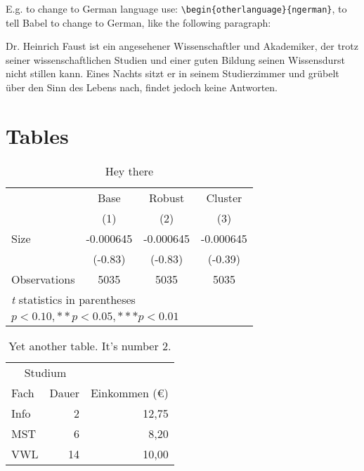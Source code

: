 E.g. to change to German language use: \verb|\begin{otherlanguage}{ngerman}|, to tell Babel to change to German, like the following paragraph:

\begin{otherlanguage}{ngerman}
Dr. Heinrich Faust ist ein angesehener Wissenschaftler und Akademiker, der trotz seiner wissenschaftlichen Studien und einer guten Bildung seinen Wissensdurst nicht stillen kann. Eines Nachts sitzt er in seinem Studierzimmer und grübelt über den Sinn des Lebens nach, findet jedoch keine Antworten.
\end{otherlanguage}

\section{Tables}

\begin{table}[H]\centering
	\libertineLF
	\begin{tabular}{l*{3}{c}}
		\toprule
		&     Base   &   Robust   &  Cluster   \\
		&\multicolumn{1}{c}{(1)}   &\multicolumn{1}{c}{(2)}   &\multicolumn{1}{c}{(3)}   \\
		\midrule
		Size            &-0.000645   &-0.000645   &-0.000645   \\
		&  (-0.83)   &  (-0.83)   &  (-0.39)   \\
		\midrule
		Observations    &     5035   &     5035   &     5035   \\
		\bottomrule
		\multicolumn{4}{l}{\footnotesize \textit{t} statistics in parentheses}\\
		\multicolumn{4}{l}{\footnotesize *\( p<0.10, ** p<0.05, *** p<0.01\)}\\
	\end{tabular}
	\caption[Short Heading]{Hey there}
	\label{tab:Observations}
	\libertineOsF
\end{table}

\begin{table}[H]\centering
	\libertineLF
\begin{tabular}{lrr} 
	\toprule
	\multicolumn{2}{c}{Studium}\\ \cmidrule{1-2}
	Fach & Dauer & Einkommen (\euro{})\\ 
	\midrule 
	Info & 2 & 12,75 \\ \addlinespace
	MST & 6 & 8,20 \\ \addlinespace
	VWL & 14 & 10,00\\ 
	\bottomrule
\end{tabular}
	\caption[Another table]{Yet another table. It’s number 2.}
	\label{tab:Money}
	\libertineOsF
\end{table}

